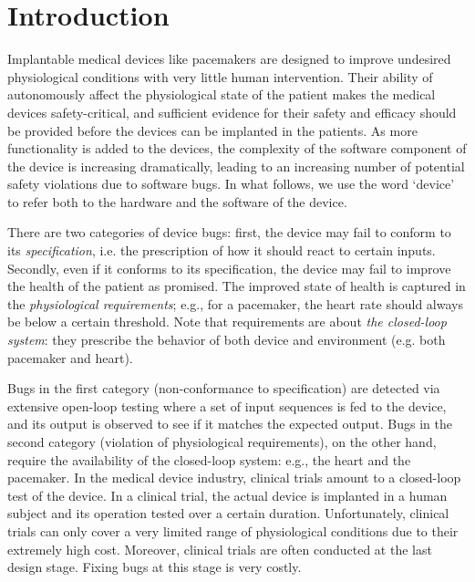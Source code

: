 \section{Introduction}
\label{introduction}

Implantable medical devices like pacemakers are designed to improve undesired physiological conditions with very little human intervention. 
Their ability of autonomously affect the physiological state of the patient makes the medical devices safety-critical, and sufficient evidence for their safety and efficacy should be provided before the devices can be implanted in the patients. 
As more functionality is added to the devices, the complexity of the software component of the device is increasing dramatically, leading to an increasing number of potential safety violations due to software bugs. 
In what follows, we use the word `device' to refer both to the hardware and the software of the device.

There are two categories of device bugs: 
first, the device may fail to conform to its \emph{specification}, i.e. the prescription of how it should react to certain inputs.  
Secondly, even if it conforms to its specification, the device may fail to improve the health of the patient as promised. 
The improved state of health is captured in the \emph{physiological requirements}; e.g., for a pacemaker, the heart rate should always be below a certain threshold. 
Note that requirements are about \emph{the closed-loop system}: they prescribe the behavior of both device and environment (e.g. both pacemaker and heart).

Bugs in the first category (non-conformance to specification) are detected via extensive open-loop testing where a set of input sequences is fed to the device, and its output is observed to see if it matches the expected output.
Bugs in the second category (violation of physiological requirements), on the other hand, require the availability of the closed-loop system: e.g., the heart and the pacemaker. 
In the medical device industry, clinical trials amount to a closed-loop test of the device. 
In a clinical trial, the actual device is implanted in a human subject and its operation tested over a certain duration.
Unfortunately, clinical trials can only cover a very limited range of physiological conditions due to their extremely high cost. 
Moreover, clinical trials are often conducted at the last design stage. Fixing bugs at this stage is very costly.

